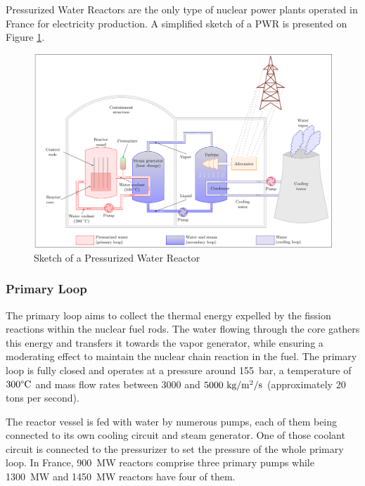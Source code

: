 Pressurized Water Reactors are the only type of nuclear power plants operated in France for electricity production. A simplified sketch of a PWR is presented on Figure \ref{fig:pwr_sketch}.

\begin{figure}[!h]
\centering
\includegraphics[width=1.0\linewidth]{img/intro/pwr_tikz.pdf}
\caption{Sketch of a Pressurized Water Reactor \cite{faccanoni_etude_2008}}
\label{fig:pwr_sketch}
\end{figure}

\npar

\subsubsection{Primary Loop}

The primary loop aims to collect the thermal energy expelled by the fission reactions within the nuclear fuel rods. The water flowing through the core gathers this energy and transfers it towards the vapor generator, while ensuring a moderating effect to maintain the nuclear chain reaction in the fuel. The primary loop is fully closed and operates at a pressure around 155\ bar, a temperature of $300\degree\mathrm{C}$ and mass flow rates between $3000$ and $5000\ \text{kg/m$^{2}$/s}$ (approximately 20 tons per second).  

\npar

The reactor vessel is fed with water by numerous pumps, each of them being connected to its own cooling circuit and steam generator. One of those coolant circuit is connected to the pressurizer to set the pressure of the whole primary loop. In France, 900~MW reactors comprise three primary pumps while 1300~MW and 1450~MW reactors have four of them.


